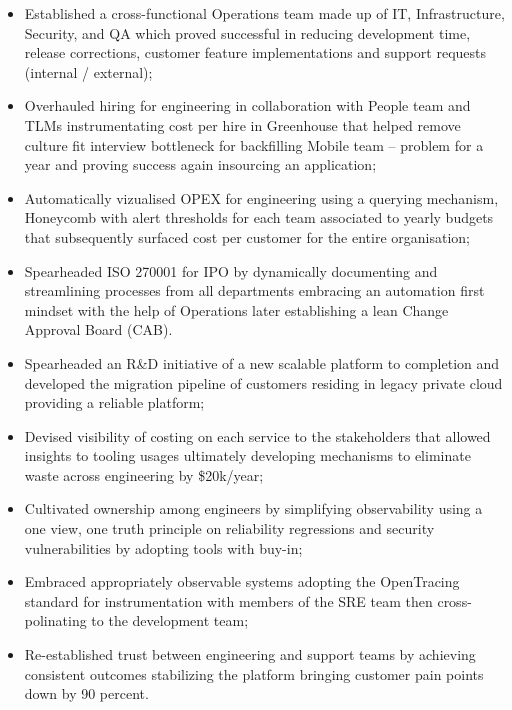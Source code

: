 \documentclass[11pt,a4paper,nolmodern,colorlinks=true,linkcolor=true]{moderncv}
\begin{document}
%
  {
    \begin{itemize}
      \item Established a cross-functional Operations team made up of IT, Infrastructure, Security, and QA which proved successful in reducing development time, release corrections, customer feature implementations and support requests (internal / external);
      \item Overhauled hiring for engineering in collaboration with People team and TLMs instrumentating cost per hire in Greenhouse that helped remove culture fit interview bottleneck for backfilling Mobile team -- problem for a year and proving success again insourcing an application;
      \item Automatically vizualised OPEX for engineering using a querying mechanism, Honeycomb with alert thresholds for each team associated to yearly budgets that subsequently surfaced cost per customer for the entire organisation;
      \item Spearheaded ISO 270001 for IPO by dynamically documenting and streamlining processes from all departments embracing an automation first mindset with the help of Operations later establishing a lean Change Approval Board (CAB).
    \end{itemize}
}

%
  {
    \begin{itemize}
      \item Spearheaded an R\&D initiative of a new scalable platform to completion and developed the migration pipeline of customers residing in legacy private cloud providing a reliable platform;
      \item Devised visibility of costing on each service to the stakeholders that allowed insights to tooling usages ultimately developing mechanisms to eliminate waste across engineering by \$20k/year;
      \item Cultivated ownership among engineers by simplifying observability using a one view, one truth principle on reliability regressions and security vulnerabilities by adopting tools with buy-in;
      \item Embraced appropriately observable systems adopting the OpenTracing standard for instrumentation with members of the SRE team then cross-polinating to the development team;
      \item Re-established trust between engineering and support teams by achieving consistent outcomes stabilizing the platform bringing customer pain points down by 90 percent.
    \end{itemize}
}
\end{document}
